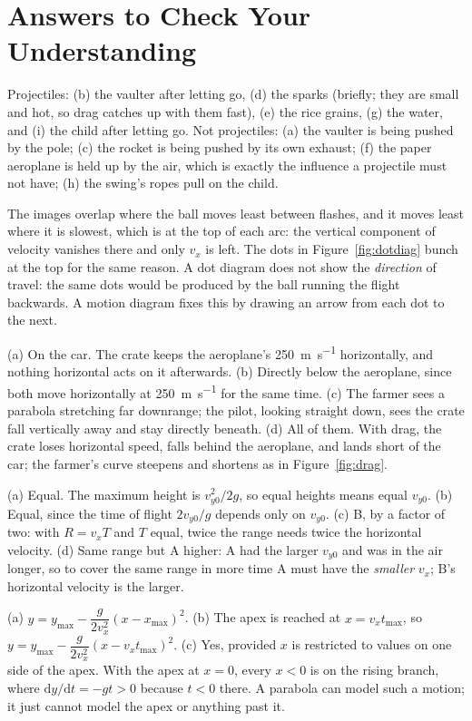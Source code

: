 \documentclass[11pt,twoside,openany]{book}
\newcommand{\dd}{\mathrm{d}}
\begin{document}
\section*{Answers to Check Your Understanding}
\begin{description}[leftmargin=2em,itemsep=2pt]
  \item[3.1] Projectiles: (b) the vaulter after letting go, (d) the sparks (briefly; they are small and hot, so drag catches up with them fast), (e) the rice grains, (g) the water, and (i) the child after letting go. Not projectiles: (a) the vaulter is being pushed by the pole; (c) the rocket is being pushed by its own exhaust; (f) the paper aeroplane is held up by the air, which is exactly the influence a projectile must not have; (h) the swing's ropes pull on the child.
  \item[3.2] The images overlap where the ball moves least between flashes, and it moves least where it is slowest, which is at the top of each arc: the vertical component of velocity vanishes there and only $v_x$ is left. The dots in Figure~\ref{fig:dotdiag} bunch at the top for the same reason. A dot diagram does not show the \emph{direction} of travel: the same dots would be produced by the ball running the flight backwards. A motion diagram fixes this by drawing an arrow from each dot to the next.
  \item[3.3] (a) On the car. The crate keeps the aeroplane's \SI{250}{\metre\per\second} horizontally, and nothing horizontal acts on it afterwards. (b) Directly below the aeroplane, since both move horizontally at \SI{250}{\metre\per\second} for the same time. (c) The farmer sees a parabola stretching far downrange; the pilot, looking straight down, sees the crate fall vertically away and stay directly beneath. (d) All of them. With drag, the crate loses horizontal speed, falls behind the aeroplane, and lands short of the car; the farmer's curve steepens and shortens as in Figure~\ref{fig:drag}.
  \item[3.4] (a) Equal. The maximum height is $v_{y0}^2/2g$, so equal heights means equal $v_{y0}$. (b) Equal, since the time of flight $2v_{y0}/g$ depends only on $v_{y0}$. (c) B, by a factor of two: with $R = v_xT$ and $T$ equal, twice the range needs twice the horizontal velocity. (d) Same range but A higher: A had the larger $v_{y0}$ and was in the air longer, so to cover the same range in more time A must have the \emph{smaller} $v_x$; B's horizontal velocity is the larger.
  \item[3.5] (a) $y = y_{\max} - \dfrac{g}{2v_x^2}(x - x_{\max})^2$. (b) The apex is reached at $x = v_x t_{\max}$, so $y = y_{\max} - \dfrac{g}{2v_x^2}(x - v_x t_{\max})^2$. (c) Yes, provided $x$ is restricted to values on one side of the apex. With the apex at $x = 0$, every $x < 0$ is on the rising branch, where $\dd y/\dd t = -gt > 0$ because $t < 0$ there. A parabola can model such a motion; it just cannot model the apex or anything past it.

\end{description}
\end{document}
